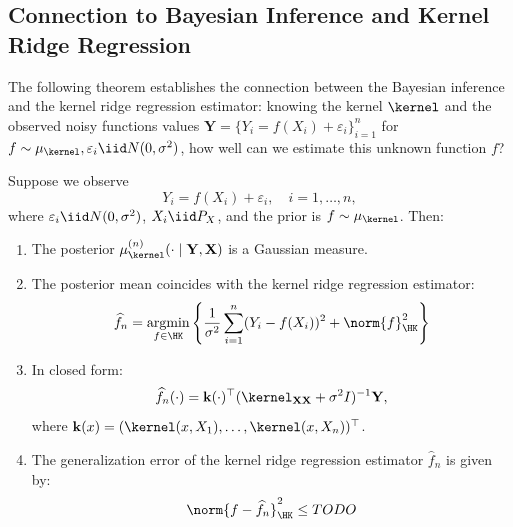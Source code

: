 \documentclass{article}
\begin{document}
\subsection{Connection to Bayesian Inference and Kernel Ridge Regression}

The following theorem establishes the connection between the Bayesian inference and the kernel ridge regression estimator: knowing the kernel $\kernel$ and the observed noisy functions values $\mathbf{Y} = \{Y_i = f(X_i) + \varepsilon_i\}_{i=1}^n$ for $f \sim \mu_\kernel, \varepsilon_i \iid N(0, \sigma^2)$, how well can we estimate this unknown function $f$?

\begin{theorem}
	\label{thm:posterior}
	Suppose we observe
	\begin{equation}
		Y_i = f(X_i) + \varepsilon_i, \quad i = 1, \ldots, n,
	\end{equation}
	where $\varepsilon_i \iid N(0, \sigma^2)$, $X_i \iid P_X$, and the prior is $f \sim \mu_\kernel$. Then:

	\begin{enumerate}[label=(\roman*)]
		\item The posterior $\mu_\kernel^{(n)}(\cdot \mid \mathbf{Y}, \mathbf{X})$ is a Gaussian measure.

		\item The posterior mean coincides with the kernel ridge regression estimator:
		      \begin{equation}
			      \hat{f}_n = \argmin_{f \in \HK} \left\{ \frac{1}{\sigma^2} \sum_{i=1}^n (Y_i - f(X_i))^2 + \norm{f}_{\HK}^2 \right\}
		      \end{equation}

		\item In closed form:
		      \begin{equation}
			      \hat{f}_n(\cdot) = \mathbf{k}(\cdot)^\top (\kernel_{\mathbf{X}\mathbf{X}} + \sigma^2 I)^{-1} \mathbf{Y},
		      \end{equation}
		      where $\mathbf{k}(x) = (\kernel(x, X_1), \ldots, \kernel(x, X_n))^\top$.

		\item The generalization error of the kernel ridge regression estimator $\hat{f}_n$ is given by:
		      \begin{equation}
			      \norm{f - \hat{f}_n}_{\HK}^2  \leq TODO
		      \end{equation}
	\end{enumerate}

\end{theorem}
\end{document}
